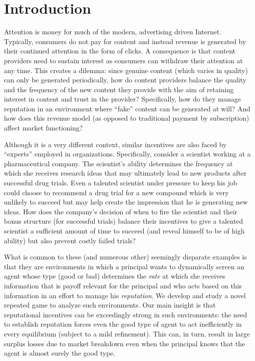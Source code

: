 \documentclass[11pt,reqno]{amsart}
\begin{document}
\maketitle

\section{Introduction}\label{sec:intro}

Attention is money for much of the modern, advertising driven Internet. Typically, consumers do not pay for content and instead revenue is generated by their continued attention in the form of clicks. A consequence is that content providers need to sustain interest as consumers can withdraw their attention at any time. This creates a dilemma: since genuine content (which varies in quality) can only be generated periodically, how do content providers balance the quality and the frequency of the new content they provide with the aim of retaining interest in content and trust in the provider? Specifically, how do they manage reputation in an environment where ``fake'' content can be generated at will? And how does this revenue model (as opposed to traditional payment by subscription) affect market functioning?

Although it is a very different context, similar incentives are also faced by ``experts'' employed in organizations. Specifically, consider a scientist working at a pharmaceutical company. The scientist's ability determines the frequency at which she receives research ideas that may ultimately lead to new products after successful drug trials. Even a talented scientist under pressure to keep his job could choose to recommend a drug trial for a new compound which is very unlikely to succeed but may help create the impression that he is generating new ideas. How does the company's decision of when to fire the scientist and their bonus structure (for successful trials) balance their incentives to give a talented scientist a sufficient amount of time to succeed (and reveal himself to be of high ability) but also prevent costly failed trials?

What is common to these (and numerous other) seemingly disparate examples is that they are environments in which a principal wants to dynamically screen an agent whose type (good or bad) determines the \emph{rate} at which she receives information that is payoff relevant for the principal and who acts based on this information in an effort to manage his \textit{reputation}. We develop and study a novel repeated game to analyze such environments. Our main insight is that reputational incentives can be exceedingly strong in such environments: the need to establish reputation forces even the good type of agent to act inefficiently in every equilibrium (subject to a mild refinement). This can, in turn, result in large surplus losses due to market breakdown even when the principal knows that the agent is almost surely the good type.
\end{document}
